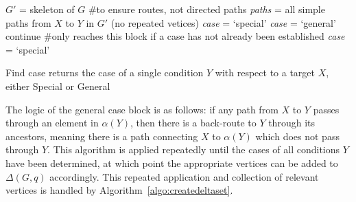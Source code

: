 \begin{algorithm}[h!]
\DontPrintSemicolon
{}
\begin{spacing}{1.25}

$G'$ = skeleton of $G$ \#to ensure routes, not directed paths \;
\textit{paths} = all simple paths from $X$ to $Y$ in $G'$ (no repeated vetices)\;
 {
	\textit{case} = `special' \;
}
 {
	 {
		 {
			\textit{case} = `general' \;
			 \;
		}
		\uElse {} {
		continue \;
		}
	}
}
\#only reaches this block if a case has not already been established \;
\textit{case} = `special' \;
\;

\end{spacing}
\caption{{\sc Find case} returns the case of a single condition $Y$ with respect to a target $X$, either Special or General}
\label{algo:findcase}
\end{algorithm}


\null \quad \quad The logic of the general case block is as follows: if any path from $X$ to $Y$ passes through an element in $\alpha(Y)$, then there is a back-route to $Y$ through its ancestors, meaning there is a path connecting $X$ to $\alpha(Y)$ which does not pass through $Y$.\newline
\null \quad \quad This algorithm is applied repeatedly until the cases of all conditions $Y$ have been determined, at which point the appropriate vertices can be added to $\Delta(G,q)$ accordingly. This repeated application and collection of relevant vertices is handled by Algorithm~\ref{algo:createdeltaset}. \newline 


